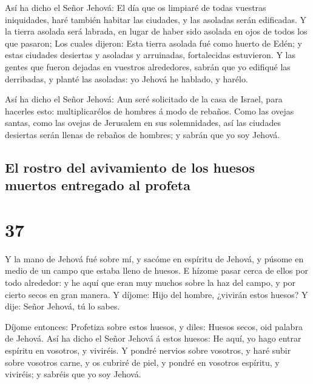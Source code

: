 Así ha dicho el Señor Jehová: El día que os limpiaré de
todas vuestras iniquidades, haré también habitar las ciudades, y las
asoladas serán edificadas.  Y la tierra asolada será
labrada, en lugar de haber sido asolada en ojos de todos los que
pasaron;  Los cuales dijeron: Esta tierra asolada fué
como huerto de Edén; y estas ciudades desiertas y asoladas y arruinadas,
fortalecidas estuvieron.  Y las gentes que fueron dejadas
en vuestros alrededores, sabrán que yo edifiqué las derribadas, y planté
las asoladas: yo Jehová he hablado, y harélo.

 Así ha dicho el Señor Jehová: Aun seré solicitado de la
casa de Israel, para hacerles esto: multiplicarélos de hombres á modo de
rebaños.  Como las ovejas santas, como las ovejas de
Jerusalem en sus solemnidades, así las ciudades desiertas serán llenas
de rebaños de hombres; y sabrán que yo soy Jehová.

\hypertarget{el-rostro-del-avivamiento-de-los-huesos-muertos-entregado-al-profeta}{%
\subsection{El rostro del avivamiento de los huesos muertos entregado al
profeta}\label{el-rostro-del-avivamiento-de-los-huesos-muertos-entregado-al-profeta}}

\hypertarget{section-26-37}{%
\section{37}\label{section-26-37}}

 Y la mano de Jehová fué sobre mí, y sacóme en espíritu de
Jehová, y púsome en medio de un campo que estaba lleno de huesos.
 E hízome pasar cerca de ellos por todo alrededor: y he
aquí que eran muy muchos sobre la haz del campo, y por cierto secos en
gran manera.  Y díjome: Hijo del hombre, ¿vivirán estos
huesos? Y dije: Señor Jehová, tú lo sabes.

 Díjome entonces: Profetiza sobre estos huesos, y diles:
Huesos secos, oid palabra de Jehová.  Así ha dicho el
Señor Jehová á estos huesos: He aquí, yo hago entrar espíritu en
vosotros, y viviréis.  Y pondré nervios sobre vosotros, y
haré subir sobre vosotros carne, y os cubriré de piel, y pondré en
vosotros espíritu, y viviréis; y sabréis que yo soy Jehová.

